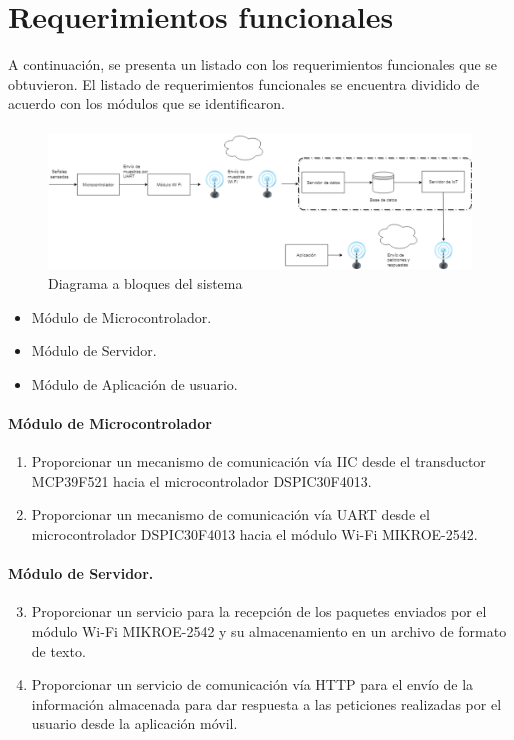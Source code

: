 \section{Requerimientos funcionales}
A continuación, se presenta un listado con los requerimientos funcionales que se obtuvieron.
El listado de requerimientos funcionales se encuentra dividido de acuerdo con los módulos que se identificaron.

\paragraph{}
\begin{figure}[H]
	\centering
	\includegraphics[scale=.3]{Capitulo3/img/diagramaBloques.png}
	\caption{Diagrama a bloques del sistema}
	\label{fig:diagrama_dispMonitoreo}
\end{figure}

\begin{itemize}
	\item Módulo de Microcontrolador.
	\item Módulo de Servidor.
	\item Módulo de Aplicación de usuario.
\end{itemize}

\paragraph{Módulo de Microcontrolador}
\begin{enumerate}[label=RF\arabic*.]
	\item Proporcionar un mecanismo de comunicación vía IIC desde el transductor MCP39F521 hacia el microcontrolador DSPIC30F4013.
	\item Proporcionar un mecanismo de comunicación vía UART desde el microcontrolador DSPIC30F4013 hacia el módulo Wi-Fi MIKROE-2542.
\end{enumerate}

\paragraph{Módulo de Servidor.}
\begin{enumerate}[label=RF\arabic*.]
	\setcounter{enumi}{2}
	\item Proporcionar un servicio para la recepción de los paquetes enviados por el módulo Wi-Fi MIKROE-2542 y su almacenamiento en un archivo de formato de texto.
	\item Proporcionar un servicio de comunicación vía HTTP para el envío de la información almacenada para dar respuesta a las peticiones realizadas por el usuario desde la aplicación móvil.  
\end{enumerate}

